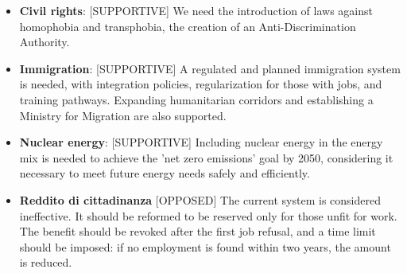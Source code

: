 \label{Third_Pole_opinions}

\begin{tcolorbox}[prompt]
\begin{itemize}
    \item \textbf{Civil rights}:
        [SUPPORTIVE] We need the introduction of laws against homophobia and transphobia, the creation of an Anti-Discrimination Authority.
    \item \textbf{Immigration}:
        [SUPPORTIVE] A regulated and planned immigration system is needed, with integration policies, regularization for those with jobs, and training pathways. Expanding humanitarian corridors and establishing a Ministry for Migration are also supported.       
    \item \textbf{Nuclear energy}: 
        [SUPPORTIVE] Including nuclear energy in the energy mix is needed to achieve the 'net zero emissions' goal by 2050, considering it necessary to meet future energy needs safely and efficiently.    
    \item \textbf{Reddito di cittadinanza}
        [OPPOSED] The current system is considered ineffective. It should be reformed to be reserved only for those unfit for work. The benefit should be revoked after the first job refusal, and a time limit should be imposed: if no employment is found within two years, the amount is reduced.
\end{itemize}
\end{tcolorbox}